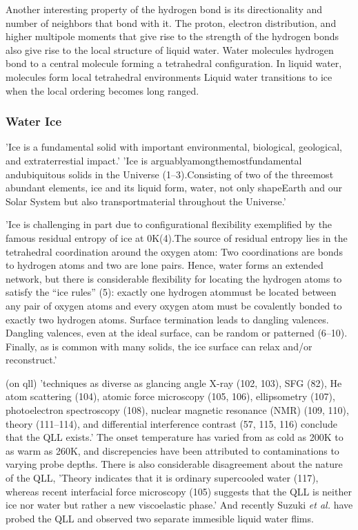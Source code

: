 Another interesting property of the hydrogen bond is its
directionality and number of neighbors that bond with it. The proton,
electron distribution, and higher multipole moments that give rise to
the strength of the hydrogen bonds also give rise to the local
structure of liquid water. Water molecules hydrogen bond to a central
molecule forming a tetrahedral configuration. In liquid water,
molecules form local tetrahedral environments Liquid water transitions
to ice when the local ordering becomes long ranged.


\subsubsection{Water Ice}
%
%
'Ice is a fundamental solid with important environmental, biological,
geological, and extraterrestial impact.'\cite{Shultz2017} 'Ice is
arguablyamongthemostfundamental andubiquitous solids in the Universe
(1–3).Consisting of two of the threemost abundant elements, ice and
its liquid form, water, not only shapeEarth and our Solar System but
also transportmaterial throughout the Universe.' 

'Ice is challenging in part due to configurational flexibility
exemplified by the famous residual entropy of ice at 0K(4).The source
of residual entropy lies in the tetrahedral coordination around the
oxygen atom: Two coordinations are bonds to hydrogen atoms and two are
lone pairs. Hence, water forms an extended network, but there is
considerable flexibility for locating the hydrogen atoms to satisfy
the “ice rules” (5): exactly one hydrogen atommust be located between
any pair of oxygen atoms and every oxygen atom must be covalently
bonded to exactly two hydrogen atoms. Surface termination leads to
dangling valences. Dangling valences, even at the ideal surface, can
be random or patterned (6–10). Finally, as is common with many solids,
the ice surface can relax and/or reconstruct.'

(on qll) 'techniques as diverse as glancing angle X-ray (102, 103),
SFG (82), He atom scattering (104), atomic force microscopy (105,
106), ellipsometry (107), photoelectron spectroscopy (108), nuclear
magnetic resonance (NMR) (109, 110), theory (111–114), and
differential interference contrast (57, 115, 116) conclude that the
QLL exists.' The onset temperature has varied from as cold as 200K to
as warm as 260K, and discrepencies have been attributed to
contaminations to varying probe depths. There is also considerable
disagreement about the nature of the QLL, 'Theory indicates that it is
ordinary supercooled water (117), whereas recent interfacial force
microscopy (105) suggests that the QLL is neither ice nor water but
rather a new viscoelastic phase.' And recently Suzuki \textit{et al.}
have probed the QLL and observed two separate immesible liquid water
flims. 

